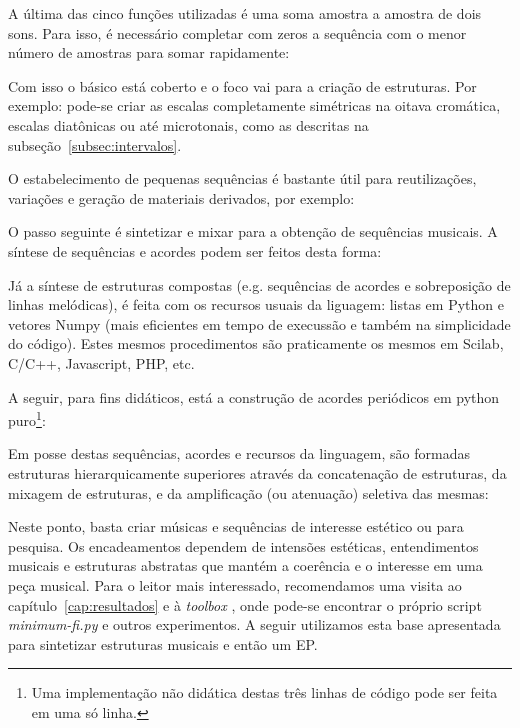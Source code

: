 
A última das cinco funções utilizadas é uma soma amostra a amostra de dois sons. Para isso,
é necessário completar com zeros a sequência com o menor número de amostras para somar rapidamente:


Com isso o básico está coberto e o foco vai para a criação de estruturas. Por exemplo: 
pode-se criar as
escalas completamente simétricas na oitava cromática, escalas diatônicas ou até microtonais, como as descritas na subseção~\ref{subsec:intervalos}.

O estabelecimento de pequenas sequências é bastante útil para
reutilizações, variações e geração de materiais derivados, por exemplo: 

O passo seguinte é sintetizar e mixar para a obtenção 
de sequências musicais. A síntese de sequências e acordes
podem ser feitos desta forma:


Já a síntese de estruturas compostas (e.g. sequências de acordes e sobreposição
de linhas melódicas), é feita com os recursos usuais da liguagem:
listas em Python e vetores Numpy (mais eficientes em tempo de
execussão e também na simplicidade do código). Estes mesmos
procedimentos são praticamente os mesmos em Scilab, C/C++, Javascript, PHP, etc.

A seguir, para fins didáticos, está a construção de acordes periódicos em
python puro\footnote{Uma implementação não didática destas três linhas de código
pode ser feita em uma só linha.}:


Em posse destas sequências, acordes e recursos da linguagem,
são formadas estruturas hierarquicamente superiores
através da concatenação de estruturas, da mixagem de estruturas, e da amplificação
(ou atenuação) seletiva das mesmas:


Neste ponto, basta criar músicas e sequências de interesse estético ou para pesquisa. Os encadeamentos dependem de intensões estéticas, entendimentos musicais e estruturas abstratas que mantém a coerência e o interesse em uma peça musical. Para o leitor mais interessado, recomendamos uma visita ao capítulo~\ref{cap:resultados} e à \emph{toolbox} \massa, onde pode-se encontrar o próprio script \emph{minimum-fi.py} e outros experimentos. 
A seguir utilizamos esta base apresentada para sintetizar estruturas musicais e então um EP.

